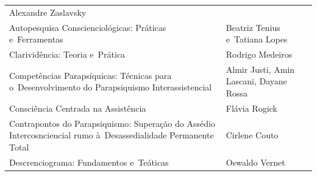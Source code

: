 \documentclass{gescons}
\begin{document}
\begin{longtable}[]{@{}
  >{\raggedright\arraybackslash}p{}
  >{\raggedright\arraybackslash}p{}@{}}
\begin{minipage}[t]{\linewidth}
Alexandre Zaslavsky
\end{minipage} \\ \addlinespace[2pt]
\hline
\begin{minipage}[t]{\linewidth}\raggedright
Autopesquisa Conscienciológicas: Práticas e~Ferramentas
\end{minipage} & \begin{minipage}[t]{\linewidth}\raggedright
Beatriz Tenius e~Tatiana Lopes
\end{minipage} \\
\hline
\begin{minipage}[t]{\linewidth}\raggedright
Clarividência: Teoria e~Prática
\end{minipage} & \begin{minipage}[t]{\linewidth}\raggedright
Rodrigo Medeiros
\end{minipage} \\
\hline
\begin{minipage}[t]{\linewidth}\raggedright
Competências Parapsíquicas: Técnicas para o~Desenvolvimento do Parapsiquismo Interassistencial
\end{minipage} & \begin{minipage}[t]{\linewidth}\raggedright
Almir Justi, Amin Lascani, Dayane Rossa
\end{minipage} \\
\hline
\begin{minipage}[t]{\linewidth}\raggedright
Consciência Centrada na Assistência
\end{minipage} & \begin{minipage}[t]{\linewidth}\raggedright
Flávia Rogick
\end{minipage} \\
\hline
\begin{minipage}[t]{\linewidth}\raggedright
Contrapontos do Parapsiquismo: Superação do Assédio Intercosnciencial rumo à~Desassedialidade Permanente Total
\end{minipage} & \begin{minipage}[t]{\linewidth}\raggedright
Cirlene Couto
\end{minipage} \\ \addlinespace[4pt]
\hline
\begin{minipage}[t]{\linewidth}\raggedright
Descrenciograma: Fundamentos e~Teáticas
\end{minipage} & \begin{minipage}[t]{\linewidth}\raggedright
Oswaldo Vernet
\end{minipage} \\

\end{longtable}
\end{document}
